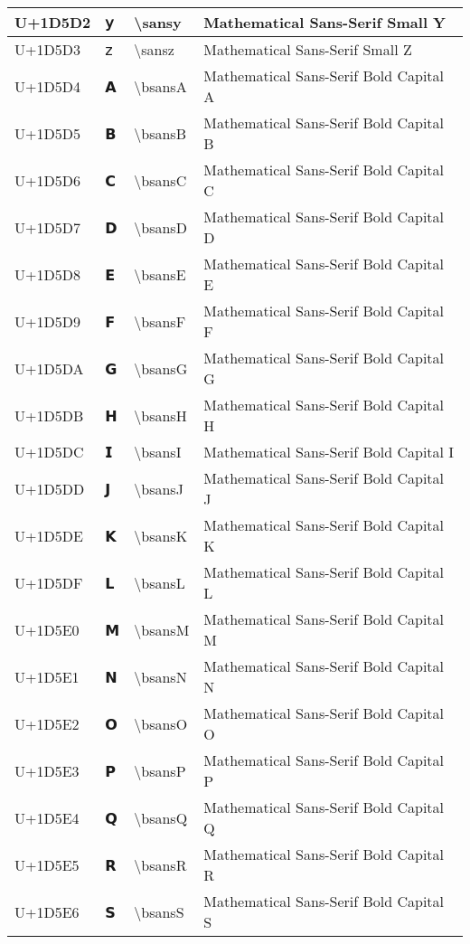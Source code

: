 \begin{table}[h]
\begin{tabulary}{\linewidth}{|L|L|L|L|}
\hline
U+1D5D2 & 𝗒 & {\textbackslash}sansy & Mathematical Sans-Serif Small Y \\
\hline
U+1D5D3 & 𝗓 & {\textbackslash}sansz & Mathematical Sans-Serif Small Z \\
\hline
U+1D5D4 & 𝗔 & {\textbackslash}bsansA & Mathematical Sans-Serif Bold Capital A \\
\hline
U+1D5D5 & 𝗕 & {\textbackslash}bsansB & Mathematical Sans-Serif Bold Capital B \\
\hline
U+1D5D6 & 𝗖 & {\textbackslash}bsansC & Mathematical Sans-Serif Bold Capital C \\
\hline
U+1D5D7 & 𝗗 & {\textbackslash}bsansD & Mathematical Sans-Serif Bold Capital D \\
\hline
U+1D5D8 & 𝗘 & {\textbackslash}bsansE & Mathematical Sans-Serif Bold Capital E \\
\hline
U+1D5D9 & 𝗙 & {\textbackslash}bsansF & Mathematical Sans-Serif Bold Capital F \\
\hline
U+1D5DA & 𝗚 & {\textbackslash}bsansG & Mathematical Sans-Serif Bold Capital G \\
\hline
U+1D5DB & 𝗛 & {\textbackslash}bsansH & Mathematical Sans-Serif Bold Capital H \\
\hline
U+1D5DC & 𝗜 & {\textbackslash}bsansI & Mathematical Sans-Serif Bold Capital I \\
\hline
U+1D5DD & 𝗝 & {\textbackslash}bsansJ & Mathematical Sans-Serif Bold Capital J \\
\hline
U+1D5DE & 𝗞 & {\textbackslash}bsansK & Mathematical Sans-Serif Bold Capital K \\
\hline
U+1D5DF & 𝗟 & {\textbackslash}bsansL & Mathematical Sans-Serif Bold Capital L \\
\hline
U+1D5E0 & 𝗠 & {\textbackslash}bsansM & Mathematical Sans-Serif Bold Capital M \\
\hline
U+1D5E1 & 𝗡 & {\textbackslash}bsansN & Mathematical Sans-Serif Bold Capital N \\
\hline
U+1D5E2 & 𝗢 & {\textbackslash}bsansO & Mathematical Sans-Serif Bold Capital O \\
\hline
U+1D5E3 & 𝗣 & {\textbackslash}bsansP & Mathematical Sans-Serif Bold Capital P \\
\hline
U+1D5E4 & 𝗤 & {\textbackslash}bsansQ & Mathematical Sans-Serif Bold Capital Q \\
\hline
U+1D5E5 & 𝗥 & {\textbackslash}bsansR & Mathematical Sans-Serif Bold Capital R \\
\hline
U+1D5E6 & 𝗦 & {\textbackslash}bsansS & Mathematical Sans-Serif Bold Capital S \\

\end{tabulary}
\end{table}
